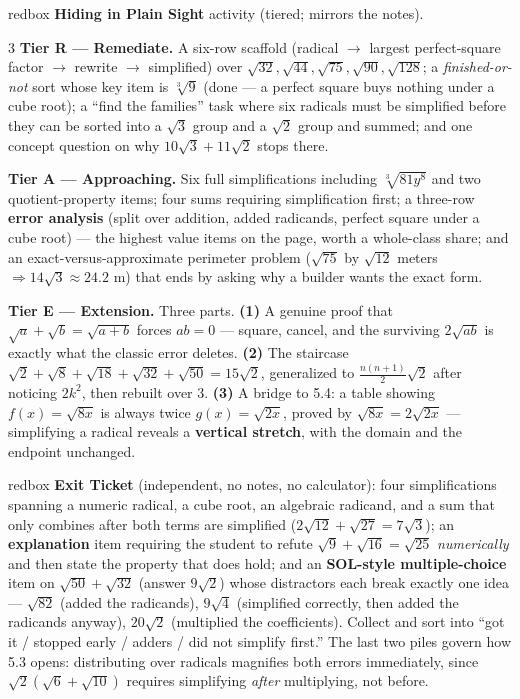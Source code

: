 \documentclass[10pt]{article}
\begin{document}
\begin{skillbox}{redbox}
\textbf{Hiding in Plain Sight} activity (tiered; mirrors the notes).
\begin{multicols}{3}
\textbf{Tier R --- Remediate.} A six-row scaffold (radical $\to$ largest perfect-square factor $\to$
rewrite $\to$ simplified) over $\sqrt{32},\sqrt{44},\sqrt{75},\sqrt{90},\sqrt{128}$; a
\emph{finished-or-not} sort whose key item is $\sqrt[3]{9}$ (done --- a perfect square buys nothing
under a cube root); a ``find the families'' task where six radicals must be simplified before they
can be sorted into a $\sqrt3$ group and a $\sqrt2$ group and summed; and one concept question on
why $10\sqrt3+11\sqrt2$ stops there.

\columnbreak
\textbf{Tier A --- Approaching.} Six full simplifications including $\sqrt[3]{81y^{8}}$ and two
quotient-property items; four sums requiring simplification first; a three-row \textbf{error
analysis} (split over addition, added radicands, perfect square under a cube root) --- the highest
value items on the page, worth a whole-class share; and an exact-versus-approximate perimeter
problem ($\sqrt{75}$ by $\sqrt{12}$ meters $\Rightarrow 14\sqrt3\approx24.2$ m) that ends by asking
why a builder wants the exact form.

\columnbreak
\textbf{Tier E --- Extension.} Three parts. \textbf{(1)} A genuine proof that
$\sqrt a+\sqrt b=\sqrt{a+b}$ forces $ab=0$ --- square, cancel, and the surviving $2\sqrt{ab}$ is
exactly what the classic error deletes. \textbf{(2)} The staircase
$\sqrt2+\sqrt8+\sqrt{18}+\sqrt{32}+\sqrt{50}=15\sqrt2$, generalized to
$\frac{n(n+1)}{2}\sqrt2$ after noticing $2k^{2}$, then rebuilt over $3$. \textbf{(3)} A bridge to
5.4: a table showing $f(x)=\sqrt{8x}$ is always twice $g(x)=\sqrt{2x}$, proved by
$\sqrt{8x}=2\sqrt{2x}$ --- simplifying a radical reveals a \textbf{vertical stretch}, with the
domain and the endpoint unchanged.
\end{multicols}
\end{skillbox}

\begin{skillbox}{redbox}
\textbf{Exit Ticket} (independent, no notes, no calculator): four simplifications spanning a
numeric radical, a cube root, an algebraic radicand, and a sum that only combines after both terms
are simplified ($2\sqrt{12}+\sqrt{27}=7\sqrt3$); an \textbf{explanation} item requiring the student
to refute $\sqrt9+\sqrt{16}=\sqrt{25}$ \emph{numerically} and then state the property that does
hold; and an \textbf{SOL-style multiple-choice} item on $\sqrt{50}+\sqrt{32}$ (answer $9\sqrt2$)
whose distractors each break exactly one idea --- $\sqrt{82}$ (added the radicands), $9\sqrt4$
(simplified correctly, then added the radicands anyway), $20\sqrt2$ (multiplied the coefficients).
Collect and sort into ``got it / stopped early / adders / did not simplify first.'' The last two
piles govern how 5.3 opens: distributing over radicals magnifies both errors immediately, since
$\sqrt2\left(\sqrt6+\sqrt{10}\right)$ requires simplifying \emph{after} multiplying, not before.
\end{skillbox}
\end{document}
